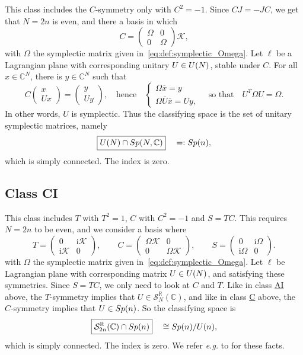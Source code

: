 \documentclass[11pt]{amsart}
\numberwithin{equation}{section} %
\newcommand\1{{\mathds 1}}
\def\CC{{\mathbb C}}
\def\RR{{\mathbb R}}
\def\ri{{\mathrm{i}}}
\def\cK{{\mathcal K}}
\def\cS{{\mathcal S}}
\def\U{{\rm U}}
\def\Sp{{\rm Sp}}
\begin{document}
This class includes the $C$-symmetry only with $C^2=-1$. Since $CJ=-JC$, we get that $N=2n$ is even, and there a basis in which
$$
C =  \begin{pmatrix}	\Omega  & 0 \\	0& \Omega \end{pmatrix} \cK,
$$
with $\Omega$ the symplectic matrix given in~\eqref{eq:def:symplectic_Omega}. Let $\ell$ be a Lagrangian plane with corresponding unitary $U \in \U(N)$, stable under $C$. For all $x \in \CC^N$, there is $y \in \CC^N$ such that 
$$
C \begin{pmatrix} x  \\	U x  \end{pmatrix} = 
\begin{pmatrix}	y  \\	U y \end{pmatrix}, 
\quad \text{hence} \quad
\begin{cases}
    \Omega \overline{x} = y \\
    \Omega \overline{U} \overline{x} = U y,
\end{cases}
\quad \text{so that} \quad
    U^T \Omega U = \Omega.
$$
In other words, $U$ is symplectic. Thus the classifying space is the set of unitary symplectic matrices, namely
$$
    \boxed{ \U(N) \cap \Sp(N,\CC)} \quad =: \Sp(n),
$$
which is simply connected. The index is zero.

\subsection{Class CI} 
\label{sec:class_CI}

This class includes $T$ with $T^2=1$, $C$ with $C^2=-1$ and $S=TC$. This requires $N=2n$ to be even, and we consider a basis where
$$
T =  \begin{pmatrix} 0 & \ri \cK \\ 	\ri \cK & 0 \end{pmatrix}, \qquad 
C= \begin{pmatrix}	\Omega \cK & 0\\ 	0 & \Omega \cK \end{pmatrix}, \qquad 
S = \begin{pmatrix}	0 & \ri \Omega\\	\ri \Omega & 0\end{pmatrix}.
$$
with $\Omega$ the symplectic matrix given in~\eqref{eq:def:symplectic_Omega}. Let $\ell$ be Lagrangian plane with corresponding matrix $U \in \U(N)$, and satisfying these symmetries. Since $S=TC$, we only need to look at $C$ and $T$.  Like in class \hyperref[sec:class_AI]{AI} above, the $T$-symmetry implies that $U \in \cS^\RR_N(\CC)$, and like in class \hyperref[sec:class_C]{C} above, the $C$-symmetry implies that $U \in \Sp(n)$. So the classifying space is
\[
    \boxed{ \cS^\RR_{2n}(\CC) \cap \Sp(n) } \quad   \cong \Sp(n)/\U(n),
\]
which is simply connected. The index is zero. We refer {\em e.g.} to \cite[Cor. A2]{GonMonPer-22} for these facts.
\end{document}
